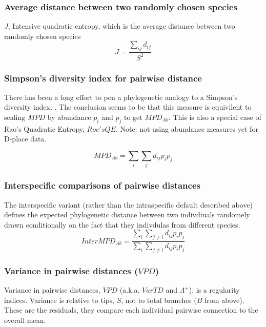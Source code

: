 \documentclass[]{book}
\theoremstyle{definition}
\theoremstyle{definition}
\theoremstyle{remark}
\begin{document}
\subsubsection{Average distance between two randomly chosen
species}\label{average-distance-between-two-randomly-chosen-species}

\(J\), Intensive quadratic entropy, which is the average distance
between two randomly chosen species \citep{Izsak2000}
\[J = \dfrac{\sum_{ij}d_{ij}}{S^2} \]

\subsubsection{Simpson's diversity index for pairwise
distance}\label{simpsons-diversity-index-for-pairwise-distance}

There has been a long effort to pen a phylogenetic analogy to a
Simpson's diversity index.
\citep{Rao1982, Clarke1998, Pavoine2005, Hardy2007, Webb2002, Webb2008, Kembel2010}.
The conclusion seems to be that this measure is equivilent to scaling
\(MPD\) by abundance \(p_{i}\) and \(p_{j}\) to get \(MPD_{Ab}\). This
is also a special case of Rao's Quadratic Entropy, \(Roe's QE\). Note:
not using abundance measures yet for D-place data.

\[MPD_{Ab} = \sum_{i} \sum_{j} d_{ij} p_{i} p_{j}\]

\subsubsection{Interspecific comparisons of pairwise
distances}\label{interspecific-comparisons-of-pairwise-distances}

The interspecific variant (rather than the intraspecific default
described above) defines the expected phylogenetic distance between two
indivdiuals randomely drawn conditionally on the fact that they
indivdulas from different species.
\[InterMPD_{Ab} = \dfrac{\sum_{i} \sum_{j \ne i} d_{ij} p_{i} p_{j} }{\sum_{i} \sum_{j \ne i} d_{ij} p_{i} p_{j}}  \]

\subsubsection{\texorpdfstring{Variance in pairwise distances
(\(VPD\))}{Variance in pairwise distances (VPD)}}\label{variance-in-pairwise-distances-vpd}

Variance in pairwise distances, \(VPD\) (a.k.a. \(VarTD\) and
\(\Lambda^+\)), is a regularity indices. \citet{Clarke2001} Variance is
relative to tips, \(S\), not to total branches (\(B\) from above). These
are the residuals, they compare each individual pairwise connection to
the overall mean.
\end{document}
